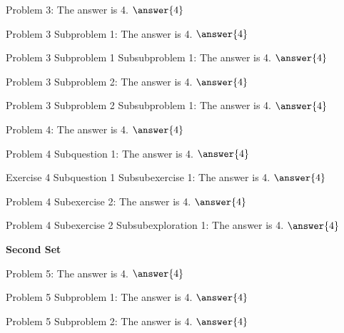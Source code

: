 \documentclass{ximera}
\begin{document}
\begin{problem}
    Problem 3: The answer is 4. $\answer{4}$
    \begin{problem}
        Problem 3 Subproblem 1: The answer is 4. $\answer{4}$
        \begin{problem}
            Problem 3 Subproblem 1 Subsubproblem 1: The answer is 4. $\answer{4}$
        \end{problem} 
    \end{problem}
    \begin{problem}
        Problem 3 Subproblem 2: The answer is 4. $\answer{4}$
        \begin{problem}
            Problem 3 Subproblem 2 Subsubproblem 1: The answer is 4. $\answer{4}$
        \end{problem} 
    \end{problem} 
\end{problem} 

\begin{problem}
    Problem 4: The answer is 4. $\answer{4}$
    \begin{question}
        Problem 4 Subquestion 1: The answer is 4. $\answer{4}$
        \begin{exercise}
            Exercise 4 Subquestion 1 Subsubexercise 1: The answer is 4. $\answer{4}$
        \end{exercise}
    \end{question}
    \begin{exercise}
        Problem 4 Subexercise 2: The answer is 4. $\answer{4}$
        \begin{exploration}
            Problem 4 Subexercise 2 Subsubexploration 1: The answer is 4. $\answer{4}$
        \end{exploration}
    \end{exercise}
\end{problem}

%
\numberedProblemstrue

{{\bfseries \large Second Set}}

\begin{problem}
    Problem 5: The answer is 4. $\answer{4}$
    \begin{problem}
        Problem 5 Subproblem 1: The answer is 4. $\answer{4}$
    \end{problem} 
    \begin{problem}
        Problem 5 Subproblem 2: The answer is 4. $\answer{4}$
    \end{problem} 
\end{problem} 
\end{document}
